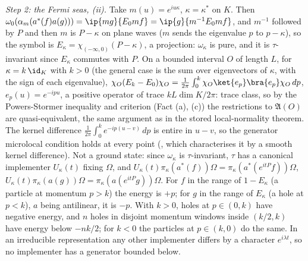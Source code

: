 \emph{Step 2: the Fermi seas, (ii).} Take $m(u) = e^{iu\kappa}$, $\kappa = \kappa^{*}$ on $K$. Then $\omega_{0}(\alpha_{m}(a^{*}(f)a(g))) = \ip{mg}{E_{0}mf} = \ip{g}{m^{-1}E_{0}mf}$, and $m^{-1}$ followed by $P$ and then $m$ is $P - \kappa$ on plane waves ($m$ sends the eigenvalue $p$ to $p - \kappa$), so the symbol is $E_{\kappa} = \chi_{(-\infty,0)}(P - \kappa)$, a projection: $\omega_{\kappa}$ is pure, and it is $\tau$-invariant since $E_{\kappa}$ commutes with $P$. On a bounded interval $O$ of length $L$, for $\kappa = k\,\id_{K}$ with $k > 0$ (the general case is the sum over eigenvectors of $\kappa$, with the sign of each eigenvalue), $\chi_{O}(E_{k} - E_{0})\chi_{O} = \frac{1}{2\pi}\int_{0}^{k}\chi_{O}\ket{e_{p}}\bra{e_{p}}\chi_{O}\,dp$, $e_{p}(u) = e^{-ipu}$, a positive operator of trace $kL\dim K/2\pi$: trace class, so by the Powers-Stormer inequality and criterion (Fact (a), (c)) the restrictions to $\mathfrak{A}(O)$ are quasi-equivalent, the same argument as in the stored local-normality theorem. The kernel difference $\frac{1}{2\pi}\int_{0}^{k}e^{-ip(u - v)}\,dp$ is entire in $u - v$, so the generator microlocal condition holds at every point (, which characterises it by a smooth kernel difference).
Not a ground state: since $\omega_{\kappa}$ is $\tau$-invariant, $\tau$ has a canonical implementer $U_{\kappa}(t)$ fixing $\Omega$, and $U_{\kappa}(t)\pi_{\kappa}(a^{*}(f))\Omega = \pi_{\kappa}(a^{*}(e^{itP}f))\Omega$, $U_{\kappa}(t)\pi_{\kappa}(a(g))\Omega = \pi_{\kappa}(a(e^{itP}g))\Omega$. For $f$ in the range of $1 - E_{\kappa}$ (a particle at momentum $p > k$) the energy is $+p$; for $g$ in the range of $E_{\kappa}$ (a hole at $p < k$), $a$ being antilinear, it is $-p$. With $k > 0$, holes at $p \in (0, k)$ have negative energy, and $n$ holes in disjoint momentum windows inside $(k/2, k)$ have energy below $-nk/2$; for $k < 0$ the particles at $p \in (k, 0)$ do the same. In an irreducible representation any other implementer differs by a character $e^{i\lambda t}$, so no implementer has a generator bounded below.

